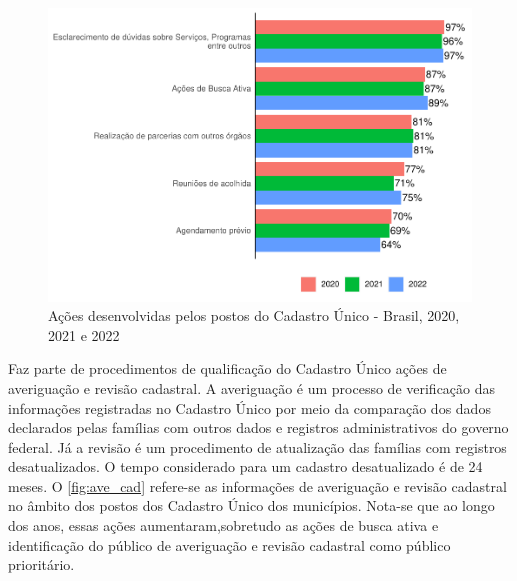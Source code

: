 \documentclass[
  brazilian]{report}
\begin{document}
\begin{figure}
\includegraphics{Censo-SUAS-2022_files/figure-latex/acoes_cad-1} \caption[Ações desenvolvidas pelos postos do Cadastro Único - Brasil, 2020, 2021 e 2022]{Ações desenvolvidas pelos postos do Cadastro Único - Brasil, 2020, 2021 e 2022}\label{fig:acoes_cad}
\end{figure}

Faz parte de procedimentos de qualificação do Cadastro Único ações de
averiguação e revisão cadastral. A averiguação é um processo de
verificação das informações registradas no Cadastro Único por meio da
comparação dos dados declarados pelas famílias com outros dados e
registros administrativos do governo federal. Já a revisão é um
procedimento de atualização das famílias com registros desatualizados. O
tempo considerado para um cadastro desatualizado é de 24 meses. O
\cref{fig:ave_cad} refere-se as informações de averiguação e revisão
cadastral no âmbito dos postos dos Cadastro Único dos municípios.
Nota-se que ao longo dos anos, essas ações aumentaram,sobretudo as ações
de busca ativa e identificação do público de averiguação e revisão
cadastral como público prioritário.
\end{document}
